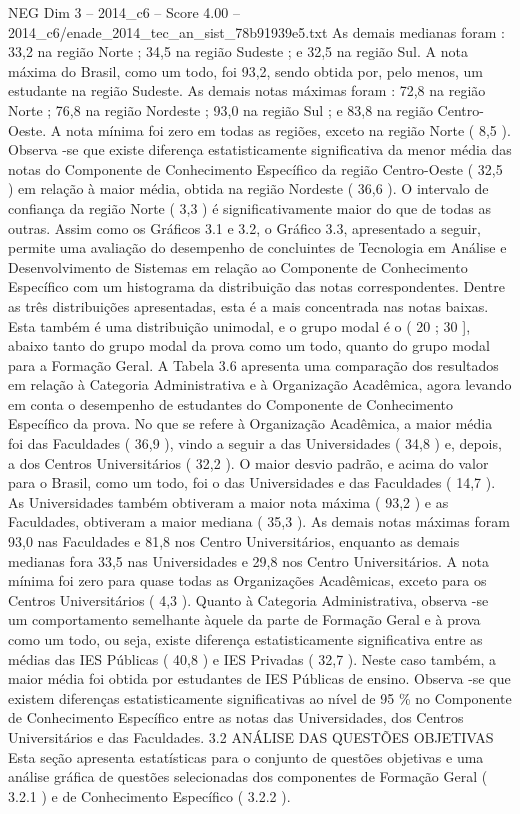 \begin{textsample}{NEG Dim 3 – 2014\_c6 – Score 4.00 – 2014\_c6/enade\_2014\_tec\_an\_sist\_78b91939e5.txt}
As demais medianas foram : 33,2 na região Norte ; 34,5 na região Sudeste ; e 32,5 na região Sul.
A nota máxima do Brasil, como um todo, foi 93,2, sendo obtida por, pelo menos, um estudante na região Sudeste.
As demais notas máximas foram : 72,8 na região Norte ; 76,8 na região Nordeste ; 93,0 na região Sul ; e 83,8 na região Centro-Oeste.
A nota mínima foi zero em todas as regiões, exceto na região Norte ( 8,5 ).
Observa -se que existe diferença estatisticamente significativa da menor média das notas do Componente de Conhecimento Específico da região Centro-Oeste ( 32,5 ) em relação à maior média, obtida na região Nordeste ( 36,6 ).
O intervalo de confiança da região Norte ( 3,3 ) é significativamente maior do que de todas as outras.
Assim como os Gráficos 3.1 e 3.2, o Gráfico 3.3, apresentado a seguir, permite uma avaliação do desempenho de concluintes de Tecnologia em Análise e Desenvolvimento de Sistemas em relação ao Componente de Conhecimento Específico com um histograma da distribuição das notas correspondentes.
Dentre as três distribuições apresentadas, esta é a mais concentrada nas notas baixas.
Esta também é uma distribuição unimodal, e o grupo modal é o ( 20 ; 30 ], abaixo tanto do grupo modal da prova como um todo, quanto do grupo modal para a Formação Geral.
A Tabela 3.6 apresenta uma comparação dos resultados em relação à Categoria Administrativa e à Organização Acadêmica, agora levando em conta o desempenho de estudantes do Componente de Conhecimento Específico da prova.
No que se refere à Organização Acadêmica, a maior média foi das Faculdades ( 36,9 ), vindo a seguir a das Universidades ( 34,8 ) e, depois, a dos Centros Universitários ( 32,2 ).
O maior desvio padrão, e acima do valor para o Brasil, como um todo, foi o das Universidades e das Faculdades ( 14,7 ).
As Universidades também obtiveram a maior nota máxima ( 93,2 ) e as Faculdades, obtiveram a maior mediana ( 35,3 ).
As demais notas máximas foram 93,0 nas Faculdades e 81,8 nos Centro Universitários, enquanto as demais medianas fora 33,5 nas Universidades e 29,8 nos Centro Universitários.
A nota mínima foi zero para quase todas as Organizações Acadêmicas, exceto para os Centros Universitários ( 4,3 ).
Quanto à Categoria Administrativa, observa -se um comportamento semelhante àquele da parte de Formação Geral e à prova como um todo, ou seja, existe diferença estatisticamente significativa entre as médias das IES Públicas ( 40,8 ) e IES Privadas ( 32,7 ).
Neste caso também, a maior média foi obtida por estudantes de IES Públicas de ensino.
Observa -se que existem diferenças estatisticamente significativas ao nível de 95 \% no Componente de Conhecimento Específico entre as notas das Universidades, dos Centros Universitários e das Faculdades. 3.2 ANÁLISE DAS QUESTÕES OBJETIVAS Esta seção apresenta estatísticas para o conjunto de questões objetivas e uma análise gráfica de questões selecionadas dos componentes de Formação Geral ( 3.2.1 ) e de Conhecimento Específico ( 3.2.2 ).

\end{textsample}
